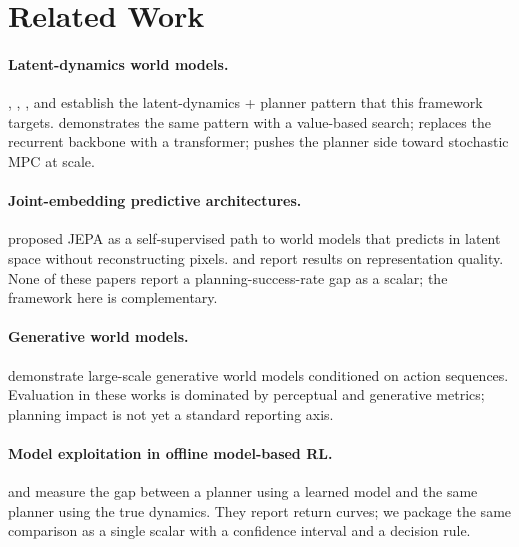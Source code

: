 \documentclass[10pt,letterpaper]{article}
\begin{document}
\section{Related Work}

\paragraph{Latent-dynamics world models.} \citet{ha2018world}, \citet{hafner2019planet}, \citet{hafner2020dreamer}, and \citet{hafner2023dreamerv3} establish the latent-dynamics + planner pattern that this framework targets. \citet{schrittwieser2020muzero} demonstrates the same pattern with a value-based search; \citet{micheli2023iris} replaces the recurrent backbone with a transformer; \citet{hansen2024tdmpc2} pushes the planner side toward stochastic MPC at scale.

\paragraph{Joint-embedding predictive architectures.} \citet{lecun2022jepa} proposed JEPA as a self-supervised path to world models that predicts in latent space without reconstructing pixels. \citet{assran2023ijepa} and \citet{bardes2024vjepa,bardes2025vjepa2} report results on representation quality. None of these papers report a planning-success-rate gap as a scalar; the framework here is complementary.

\paragraph{Generative world models.} \citet{bruce2024genie,bruce2024genie2} demonstrate large-scale generative world models conditioned on action sequences. Evaluation in these works is dominated by perceptual and generative metrics; planning impact is not yet a standard reporting axis.

\paragraph{Model exploitation in offline model-based RL.} \citet{yu2020mopo} and \citet{kidambi2020morel} measure the gap between a planner using a learned model and the same planner using the true dynamics. They report return curves; we package the same comparison as a single scalar with a confidence interval and a decision rule.
\end{document}
